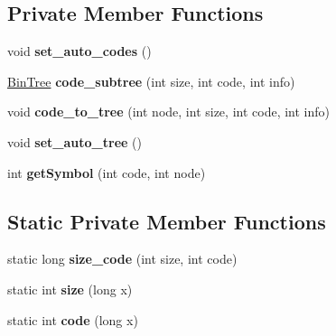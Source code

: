 \subsection*{Private Member Functions}
\begin{DoxyCompactItemize}
\item 
\mbox{\label{classdomini_1_1algorithm_1_1Huffman_a5f263f76053992912e0571a8cce8f710}} 
void {\bfseries set\+\_\+auto\+\_\+codes} ()
\item 
\mbox{\label{classdomini_1_1algorithm_1_1Huffman_aa3456238bbda43d0ed066e1bb028777e}} 
\hyperlink{classdomini_1_1utils_1_1BinTree}{Bin\+Tree} {\bfseries code\+\_\+subtree} (int size, int code, int info)
\item 
\mbox{\label{classdomini_1_1algorithm_1_1Huffman_ab0a932eb127fb421e136205be8a26418}} 
void {\bfseries code\+\_\+to\+\_\+tree} (int node, int size, int code, int info)
\item 
\mbox{\label{classdomini_1_1algorithm_1_1Huffman_a7cc808d84aa7616bd4761172f88d8e4c}} 
void {\bfseries set\+\_\+auto\+\_\+tree} ()
\item 
\mbox{\label{classdomini_1_1algorithm_1_1Huffman_ad1dafb062b641d7294fa057c3a7d053e}} 
int {\bfseries get\+Symbol} (int code, int node)
\end{DoxyCompactItemize}
\subsection*{Static Private Member Functions}
\begin{DoxyCompactItemize}
\item 
\mbox{\label{classdomini_1_1algorithm_1_1Huffman_a4c43ebb729de31b90c3c435b9765c5d4}} 
static long {\bfseries size\+\_\+code} (int size, int code)
\item 
\mbox{\label{classdomini_1_1algorithm_1_1Huffman_a9ebf8a890196bc1f3af6917707c1096f}} 
static int {\bfseries size} (long x)
\item 
\mbox{\label{classdomini_1_1algorithm_1_1Huffman_a6ff0cdc5b992431ccfe8d77971ebf5e8}} 
static int {\bfseries code} (long x)
\end{DoxyCompactItemize}
